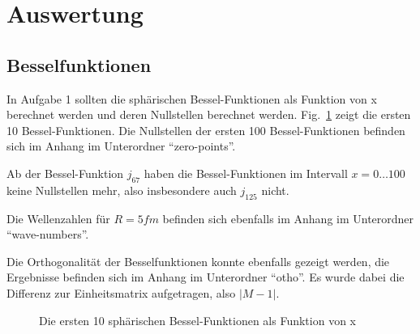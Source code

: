 
\section{Auswertung}
\label{sec:auswertung}

\subsection{Besselfunktionen}
\label{sec:bessel}

In Aufgabe 1 sollten die sphärischen Bessel-Funktionen als Funktion
von x berechnet werden und deren Nullstellen berechnet
werden. Fig.~\ref{img.bessel} zeigt die ersten 10
Bessel-Funktionen. Die Nullstellen der ersten 100 Bessel-Funktionen
befinden sich im Anhang im Unterordner ``zero-points''.

Ab der Bessel-Funktion $j_{67}$ haben die Bessel-Funktionen im
Intervall $x = 0 \ldots 100$ keine Nullstellen mehr, also insbesondere
auch $j_{125}$ nicht.

Die Wellenzahlen für $R = \unit{5}{fm}$ befinden sich ebenfalls im
Anhang im Unterordner ``wave-numbers''.

Die Orthogonalität der Besselfunktionen konnte ebenfalls gezeigt
werden, die Ergebnisse befinden sich im Anhang im Unterordner
``otho''. Es wurde dabei die Differenz zur Einheitsmatrix aufgetragen,
also $| M - 1 |$.

\begin{figure}[htbp]
  \centering
  \caption{Die ersten 10 sphärischen Bessel-Funktionen als Funktion von x}
  \label{img.bessel}
\end{figure}

